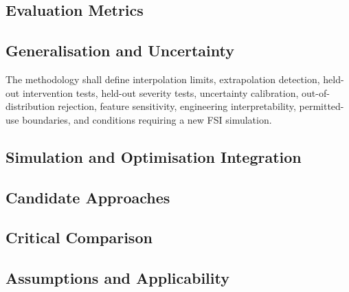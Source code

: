 
\subsection{Evaluation Metrics}
\label{sec:res-ml-gen-evaluation-metrics}


\subsection{Generalisation and Uncertainty}
\label{sec:res-ml-gen-generalisation-uncertainty}

The methodology shall define interpolation limits, extrapolation detection,
held-out intervention tests, held-out severity tests, uncertainty calibration,
out-of-distribution rejection, feature sensitivity, engineering
interpretability, permitted-use boundaries, and conditions requiring a new FSI
simulation.

\subsection{Simulation and Optimisation Integration}
\label{sec:res-ml-gen-simulation-optimisation-integration}


\subsection{Candidate Approaches}
\label{sec:res-ml-gen-candidate-approaches}


\subsection{Critical Comparison}
\label{sec:res-ml-gen-critical-comparison}


\subsection{Assumptions and Applicability}
\label{sec:res-ml-gen-assumptions}

